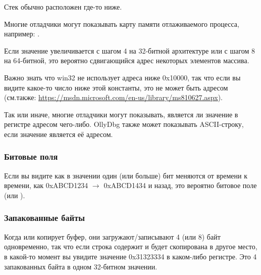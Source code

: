 Стек обычно расположен где-то ниже. %

Многие отладчики могут показывать карту памяти отлаживаемого процесса, например: .

Если значение увеличивается с шагом 4 на 32-битной архитектуре или с шагом 8 на 64-битной,
это вероятно сдвигающийся адрес некоторых элементов массива.

Важно знать что win32 не использует адреса ниже 0x10000, так что если вы видите какое-то число ниже этой константы,
это не может быть адресом (см.также: \url{https://msdn.microsoft.com/en-us/library/ms810627.aspx}).

Так или иначе, многие отладчики могут показывать, является ли значение в регистре адресом чего-либо.
OllyDbg также может показывать ASCII-строку, если значение является её адресом.

\subsubsection{Битовые поля}

Если вы видите как в значении один (или больше) бит меняются от времени к времени, как 0xABCD1234 $\rightarrow$ 0xABCD1434 и назад,
это вероятно битовое поле (или ).

\subsubsection{Запакованные байты}

Когда  или  копирует буфер, они загружают/записывают 4 (или 8) байт одновременно,
так что если строка содержит  и будет скопирована в другое место,
в какой-то момент вы увидите значение 0x31323334 в каком-либо регистре.
Это 4 запакованных байта в одном 32-битном значении.

